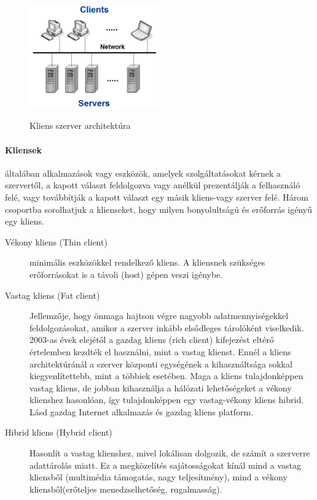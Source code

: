 \begin{figure}[h!]
  \centering
	\includegraphics[width=0.5\textwidth]{chapters/chap3/cs.jpg}\\
	\caption{Kliens szerver architektúra}
\end{figure}

  \paragraph{Kliensek} általában alkalmazások vagy eszközök, amelyek szolgáltatásokat kérnek a szervertől, a kapott választ feldolgozva vagy anélkül prezentálják a felhasználó felé, vagy továbbítják a kapott választ egy másik kliens-vagy szerver felé.
Három csoportba sorolhatjuk a klienseket, hogy milyen bonyolultságú és erőforrás igényű egy kliens.
  \begin{description}
    \item[Vékony kliens (Thin client)] minimális eszközökkel rendelkező kliens. A kliensnek szükséges erőforrásokat is a távoli (host) gépen veszi igénybe.
    \item[Vastag kliens (Fat client)] Jellemzője, hogy önmaga hajtson végre nagyobb adatmennyiségekkel feldolgozásokat, amikor a szerver inkább elsődleges tárolóként viselkedik. 2003-as évek elejétől a gazdag kliens (rich client) kifejezést eltérő értelemben kezdték el használni, mint a vastag klienst. Ennél a kliens architektúránál a szerver központi egységének a kihasználtsága sokkal kiegyenlítettebb, mint a többiek esetében. Maga a kliens tulajdonképpen vastag kliens, de jobban kihasználja a hálózati lehetőségeket a vékony klienshez hasonlóan, így tulajdonképpen egy vastag-vékony kliens hibrid. Lásd gazdag Internet alkalmazás és gazdag kliens platform.
    \item[Hibrid kliens (Hybrid client)] Hasonlít a vastag klienshez, mivel lokálisan dolgozik, de számít a szerverre adattárolás miatt. Ez a megközelítés sajátosságokat kínál mind a vastag kliensből (multimédia támogatás, nagy teljesítmény), mind a vékony kliensből(erőteljes menedzselhetőség, rugalmasság).
  \end{description}

